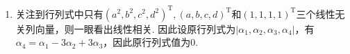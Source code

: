 \documentclass[12pt,fontset=fandol]{ctexart}
\begin{document}
\begin{solve}
\begin{enumerate}
\begin{align*}
\begin{vmatrix}
                                   d^{2} & 2d+1 & 4d+4 & 4
                               \end{vmatrix}    \\
                           & = 4\begin{vmatrix}
                                    a^{2} & 2a & 4a & 1 \\
                                    b^{2} & 2b & 4b & 1 \\
                                    c^{2} & 2c & 4c & 1 \\
                                    d^{2} & 2d & 4d & 1
                                \end{vmatrix}=0.
                      \end{align*}

                \item 关注到行列式中只有$(a^2, b^2, c^2, d^2)^\mathrm{T}, (a, b, c, d)^\mathrm{T}$和$(1, 1, 1, 1)^\mathrm{T}$三个线性无关列向量，则一眼看出线性相关. 因此设原行列式为$|\alpha_1, \alpha_2, \alpha_3, \alpha_4|$，有$\alpha_4=\alpha_1-3\alpha_2+3\alpha_3$，因此原行列式值为0.
            \end{enumerate}
\end{solve}
\end{document}

